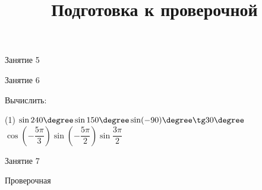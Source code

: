 \begin{class}[number=5]
	\begin{listofex}
		\item Занятие 5
	\end{listofex}
	\end{class}
	
	\begin{class}[number=6]
		\begin{listofex}
			\item Занятие 6
		\end{listofex}
	\end{class}
	
	\begin{homework}[number=3]
		\begin{listofex}
			\item Вычислить:
			\begin{tasks}(1)
				\task \( \sin240\degree\sin150\degree\sin(-90)\degree\tg30\degree \)
				\task \( \cos\left( -\dfrac{5\pi}{3} \right)\sin\left( -\dfrac{5\pi}{2} \right)\sin\dfrac{3\pi}{2} \)
			\end{tasks}
		\end{listofex}
	\end{homework}
	
	\begin{class}[number=7]
		\title{Подготовка к проверочной}
		\begin{listofex}
			\item Занятие 7
		\end{listofex}
	\end{class}
	
	\begin{exam}
		\begin{listofex}
			\item Проверочная
		\end{listofex}
	\end{exam}
